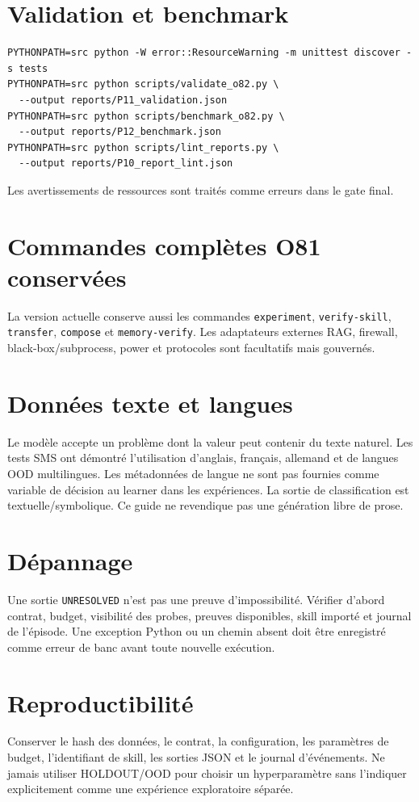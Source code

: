 \documentclass[11pt,a4paper]{report}
\begin{document}
\chapter{Validation et benchmark}
\begin{verbatim}
PYTHONPATH=src python -W error::ResourceWarning -m unittest discover -s tests
PYTHONPATH=src python scripts/validate_o82.py \
  --output reports/P11_validation.json
PYTHONPATH=src python scripts/benchmark_o82.py \
  --output reports/P12_benchmark.json
PYTHONPATH=src python scripts/lint_reports.py \
  --output reports/P10_report_lint.json
\end{verbatim}
Les avertissements de ressources sont traités comme erreurs dans le gate final.

\chapter{Commandes complètes O81 conservées}
La version actuelle conserve aussi les commandes \texttt{experiment}, \texttt{verify-skill}, \texttt{transfer}, \texttt{compose} et \texttt{memory-verify}. Les adaptateurs externes RAG, firewall, black-box/subprocess, power et protocoles sont facultatifs mais gouvernés.

\chapter{Données texte et langues}
Le modèle accepte un problème dont la valeur peut contenir du texte naturel. Les tests SMS ont démontré l'utilisation d'anglais, français, allemand et de langues OOD multilingues. Les métadonnées de langue ne sont pas fournies comme variable de décision au learner dans les expériences. La sortie de classification est textuelle/symbolique. Ce guide ne revendique pas une génération libre de prose.

\chapter{Dépannage}
Une sortie \texttt{UNRESOLVED} n'est pas une preuve d'impossibilité. Vérifier d'abord contrat, budget, visibilité des probes, preuves disponibles, skill importé et journal de l'épisode. Une exception Python ou un chemin absent doit être enregistré comme erreur de banc avant toute nouvelle exécution.

\chapter{Reproductibilité}
Conserver le hash des données, le contrat, la configuration, les paramètres de budget, l'identifiant de skill, les sorties JSON et le journal d'événements. Ne jamais utiliser HOLDOUT/OOD pour choisir un hyperparamètre sans l'indiquer explicitement comme une expérience exploratoire séparée.
\end{document}
